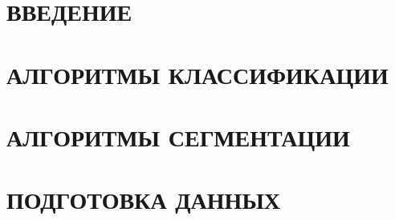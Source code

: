 \documentclass[14pt,a4paper]{extreport}
\begin{document}


\newpage
\tableofcontents

\newpage
{}
\chapter*{ВВЕДЕНИЕ}


\newpage
\chapter{АЛГОРИТМЫ КЛАССИФИКАЦИИ}


\newpage
\chapter{АЛГОРИТМЫ СЕГМЕНТАЦИИ}


\newpage
\chapter{ПОДГОТОВКА ДАННЫХ}

\end{document}
